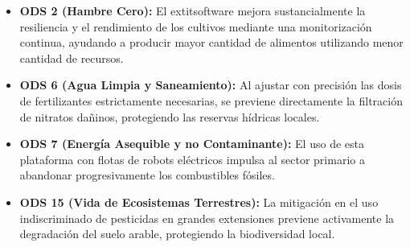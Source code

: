\begin{itemize}
    \item \textbf{ODS 2 (Hambre Cero):} El 	extit{software} mejora sustancialmente la resiliencia y el rendimiento de los cultivos mediante una monitorización continua, ayudando a producir mayor cantidad de alimentos utilizando menor cantidad de recursos.
    \item \textbf{ODS 6 (Agua Limpia y Saneamiento):} Al ajustar con precisión las dosis de fertilizantes estrictamente necesarias, se previene directamente la filtración de nitratos dañinos, protegiendo las reservas hídricas locales.
    \item \textbf{ODS 7 (Energía Asequible y no Contaminante):} El uso de esta plataforma con flotas de robots eléctricos impulsa al sector primario a abandonar progresivamente los combustibles fósiles.
    \item \textbf{ODS 15 (Vida de Ecosistemas Terrestres):} La mitigación en el uso indiscriminado de pesticidas en grandes extensiones previene activamente la degradación del suelo arable, protegiendo la biodiversidad local.
\end{itemize}
